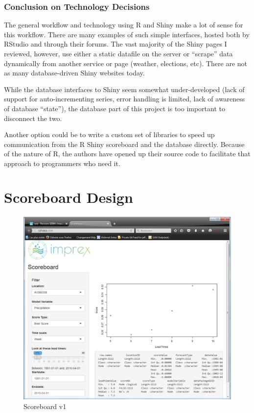 \documentclass[logos,parttoc,morelanguage=french,morelanguage=german]{orsay-memoire}
\begin{document}
\section{Conclusion on Technology Decisions}
The general workflow and technology using R and Shiny make a lot of sense for this workflow. There are many examples of such simple interfaces, hosted both by RStudio and through their forums. The vast majority of the Shiny pages I reviewed, however, use either a static datafile on the server or ``scrape'' data dynamically from another service or page (weather, elections, etc). There are not as many database-driven Shiny websites today.

While the database interfaces to Shiny seem somewhat under-developed (lack of support for auto-incrementing series, error handling is limited, lack of awareness of database ``state''), the database part of this project is too important to disconnect the two.

Another option could be to write a custom set of libraries to speed up communication from the R Shiny scoreboard and the database directly. Because of the nature of R, the authors have opened up their source code to facilitate that approach to programmers who need it.


\part{Scoreboard Design}

\begin{figure}[ht]
\centering
\includegraphics[width=0.8\linewidth]{images/sbdV1v21notes.png}
  \caption{Scoreboard v1}
  \label{fig:scoreboard v1}
\end{figure}
\end{document}
